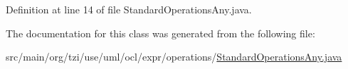 Definition at line 14 of file Standard\-Operations\-Any.\-java.



The documentation for this class was generated from the following file\-:\begin{DoxyCompactItemize}
\item 
src/main/org/tzi/use/uml/ocl/expr/operations/\hyperlink{_standard_operations_any_8java}{Standard\-Operations\-Any.\-java}\end{DoxyCompactItemize}
